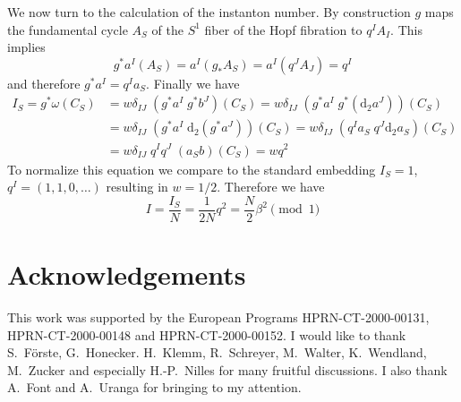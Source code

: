 \documentclass[a4paper,12pt,twoside]{article}
\numberwithin{equation}{section}
\newcommand{\Dd}{\text{d}}      %
\begin{document}
We now turn to the calculation of the instanton number.  By
construction $g$ maps the fundamental cycle $A_S$ of the $S^1$ fiber
of the Hopf fibration to $q^I A_I$. This implies
\begin{equation}
  g^* a^I (A_S) = a^I (g_* A_S) = a^I (q^J A_J) = q^I
\end{equation}
and therefore $g^* a^I = q^I a_S$. Finally we have
\begin{equation}
  \begin{split}
    I_S = g^* \omega (C_S)
    &= w \delta_{IJ} \; (g^* a^I \; g^* b^J) (C_S)
    = w \delta_{IJ} \; (g^* a^I \; g^* (\Dd_2 a^J)) (C_S) \\
    &= w \delta_{IJ} \; (g^* a^I \; \Dd_2 (g^* a^J)) (C_S)
    = w \delta_{IJ} \; (q^I a_S \; q^J \Dd_2 a_S) (C_S) \\
    &= w \delta_{IJ} \; q^I q^J \; (a_S b) (C_S)
    = w q^2
  \end{split}
\end{equation}
To normalize this equation we compare to the standard embedding
$I_S=1$, $q^I=(1,1,0,\ldots)$ resulting in $w=1/2$. Therefore we have
\begin{equation}
  \label{eq:Final}
  I = \frac{I_S}{N} = \frac{1}{2N} q^2 = \frac{N}{2} \beta^2 \pmod 1
\end{equation}



\section*{Acknowledgements}

This work was supported by the European Programs HPRN-CT-2000-00131,
HPRN-CT-2000-00148 and HPRN-CT-2000-00152.  I would like to thank
S.~F\"orste, G.~Honecker. H.~Klemm, R.~Schreyer, M.~Walter,
K.~Wendland, M.~Zucker and especially H.-P.~Nilles for many fruitful
discussions. I also thank A.~Font and A.~Uranga for bringing
\cite{Aldazabal} to my attention.
\end{document}
